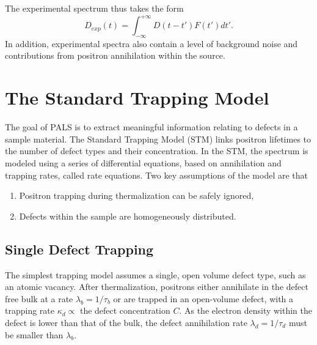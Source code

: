 The experimental spectrum thus takes the form
\begin{equation}
    D_{exp} (t) = \int_{-\infty}^{+\infty} D(t-t') F(t') dt'.
\end{equation}
In addition, experimental spectra also contain a level of background noise and contributions from positron annihilation within the source.

\section{The Standard Trapping Model}

The goal of PALS is to extract meaningful information relating to defects in a sample material. The Standard Trapping Model (STM) links positron lifetimes to the number of defect types and their concentration. In the STM, the spectrum is modeled using a series of differential equations, based on annihilation and trapping rates, called rate equations. Two key assumptions of the model are that

\begin{enumerate}[label=(\roman*)]
    \item Positron trapping during thermalization can be safely ignored,
    \item Defects within the sample are homogeneously distributed.
\end{enumerate}

\subsection{Single Defect Trapping}

The simplest trapping model assumes a single, open volume defect type, such as an atomic vacancy. After thermalization, positrons either annihilate in the defect free bulk at a rate $\lambda_b = 1/\tau_b$ or are trapped in an open-volume defect, with a trapping rate $\kappa_d \propto$ the defect concentration $C$. As the electron density within the defect is lower than that of the bulk, the defect annihilation rate $\lambda_d = 1/\tau_d$ must be smaller than $\lambda_b$.

